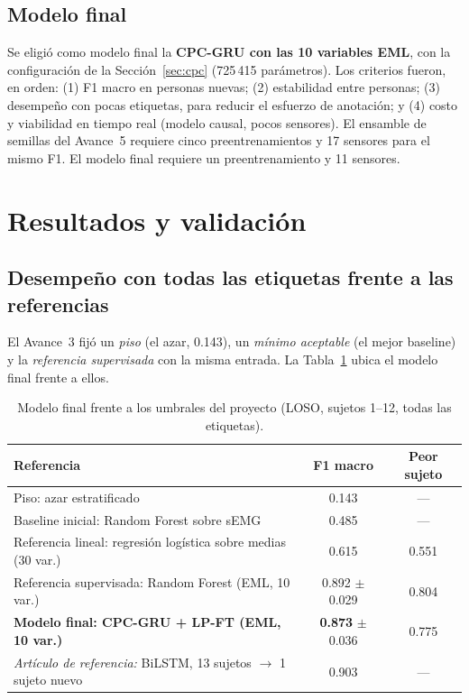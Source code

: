 \documentclass[letterpaper,11pt]{article}
\begin{document}
\subsection{Modelo final}
\label{sec:final}
Se eligió como modelo final la \textbf{CPC-GRU con las 10 variables EML}, con la configuración de la Sección~\ref{sec:cpc} (725\,415 parámetros). Los criterios fueron, en orden: (1) F1 macro en personas nuevas; (2) estabilidad entre personas; (3) desempeño con pocas etiquetas, para reducir el esfuerzo de anotación; y (4) costo y viabilidad en tiempo real (modelo causal, pocos sensores). El ensamble de semillas del Avance~5 requiere cinco preentrenamientos y 17 sensores para el mismo F1. El modelo final requiere un preentrenamiento y 11 sensores.

\section{Resultados y validación}

\subsection{Desempeño con todas las etiquetas frente a las referencias}
El Avance~3 fijó un \emph{piso} (el azar, 0.143), un \emph{mínimo aceptable} (el mejor baseline) y la \emph{referencia supervisada} con la misma entrada. La Tabla~\ref{tab:final} ubica el modelo final frente a ellos.

\begin{table}[H]
  \centering
  \small
  \caption{Modelo final frente a los umbrales del proyecto (LOSO, sujetos 1--12, todas las etiquetas).}
  \label{tab:final}
  \begin{tabular}{p{9.6cm}cc}
    \toprule
    Referencia & F1 macro & Peor sujeto \\
    \midrule
    Piso: azar estratificado                                  & 0.143 & --- \\
    Baseline inicial: Random Forest sobre sEMG                & 0.485 & --- \\
    Referencia lineal: regresión logística sobre medias (30 var.) & 0.615 & 0.551 \\
    Referencia supervisada: Random Forest (EML, 10 var.)      & 0.892 $\pm$ 0.029 & 0.804 \\
    \textbf{Modelo final: CPC-GRU + LP-FT (EML, 10 var.)}     & \textbf{0.873} $\pm$ 0.036 & 0.775 \\
    \midrule
    \emph{Artículo de referencia:} BiLSTM, 13 sujetos $\to$ 1 sujeto nuevo \parencite{bassani2025} & 0.903 & --- \\
    \bottomrule
  \end{tabular}
\end{table}
\end{document}
